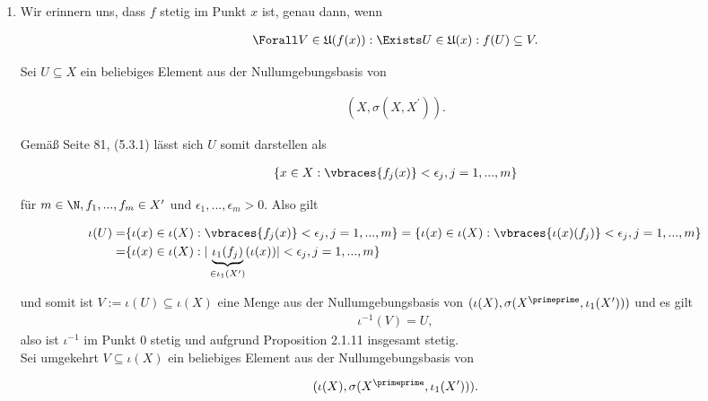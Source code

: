 \begin{solution}

\phantom{}

\begin{enumerate}[label = (\arabic*)]

  \item
  Wir erinnern uns, dass $f$ stetig im Punkt $x$ ist, genau dann, wenn

  \begin{align*}
    \Forall V \in \mathfrak{U}(f(x)):
    \Exists U \in \mathfrak{U}(x):
    f(U) \subseteq V.
  \end{align*}

  Sei $U \subseteq X$ ein beliebiges Element aus der Nullumgebungsbasis von

  \begin{align*}
    (X,\sigma(X,X^{\prime})).
  \end{align*}

  Gemäß Seite 81, (5.3.1) lässt sich $U$ somit darstellen als

  \begin{align*}
    \{x \in X: \vbraces{f_{j}(x)}<\epsilon_j, j=1,...,m\}
  \end{align*}

  für $m \in \N,f_1,...,f_m \in X^{\prime}$ und $\epsilon_1,...,\epsilon_m > 0$.
  Also gilt

  \begin{align*}
    \iota(U) =& \{\iota(x) \in \iota(X): \vbraces{f_{j}(x)}<\epsilon_j, j=1,...,m\} = \{\iota(x) \in \iota(X): \vbraces{\iota(x)(f_{j})}<\epsilon_j, j=1,...,m\} \\
    =& \{\iota(x) \in \iota(X): |\underbrace{\iota_1 (f_{j})}_{\in \iota_1 (X^{\prime})}(\iota(x))|<\epsilon_j, j=1,...,m\}
  \end{align*}

  und somit ist $V := \iota(U) \subseteq \iota(X)$ eine Menge aus der Nullumgebungsbasis von $(\iota(X),\sigma(X^{\primeprime},\iota_1(X^{\prime})))$ und es gilt
  \begin{align*}
    \iota^{-1}(V) = U,
  \end{align*}
  also ist $\iota^{-1}$ im Punkt $0$ stetig und aufgrund Proposition 2.1.11
  insgesamt stetig. \\
  Sei umgekehrt $V \subseteq \iota(X)$ ein beliebiges Element aus der Nullumgebungsbasis von

  \begin{align*}
    (\iota(X),\sigma(X^{\primeprime},\iota_1(X^{\prime}))).
  \end{align*}


\end{enumerate}
\end{solution}
